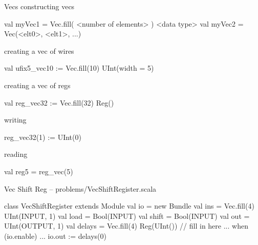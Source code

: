 \documentclass[xcolor=pdflatex,dvipsnames,table]{beamer}
\begin{document}
\begin{frame}[fragile]{Vecs}
constructing vecs
\begin{scala}
val myVec1 = Vec.fill( <number of elements> ) { <data type> }
val myVec2 = Vec(<elt0>, <elt1>, ...)
\end{scala}

creating a vec of wires
\begin{scala}
val ufix5_vec10 := Vec.fill(10) { UInt(width = 5) }
\end{scala}


creating a vec of regs
\begin{scala}
val reg_vec32 := Vec.fill(32){ Reg() }
\end{scala}

writing
\begin{scala}
reg_vec32(1) := UInt(0)
\end{scala}

reading
\begin{scala}
val reg5 = reg_vec(5)
\end{scala}

\end{frame}

\begin{frame}[fragile]{Vec Shift Reg -- problems/VecShiftRegister.scala}

{
\begin{scala}
class VecShiftRegister extends Module {
  val io = new Bundle {
    val ins   = Vec.fill(4){ UInt(INPUT, 1) }
    val load  = Bool(INPUT)
    val shift = Bool(INPUT)
    val out   = UInt(OUTPUT, 1)
  }
  val delays = Vec.fill(4){ Reg(UInt()) }
  // fill in here ...
  when (io.enable) {
    ...
  }
  io.out := delays(0)
}
\end{scala}
}

\end{frame}

\end{document}
